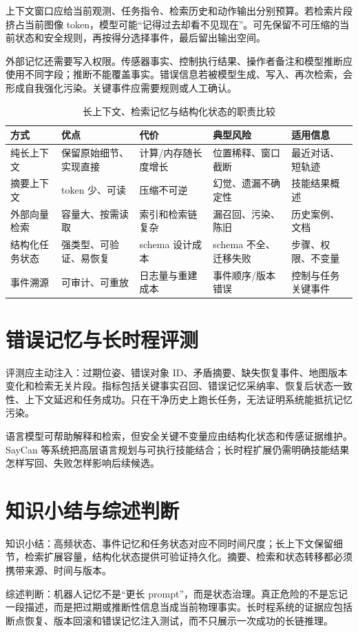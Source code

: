 上下文窗口应给当前观测、任务指令、检索历史和动作输出分别预算。若检索片段挤占当前图像 token，模型可能“记得过去却看不见现在”。可先保留不可压缩的当前状态和安全规则，再按得分选择事件，最后留出输出空间。

外部记忆还需要写入权限。传感器事实、控制执行结果、操作者备注和模型推断应使用不同字段；推断不能覆盖事实。错误信息若被模型生成、写入、再次检索，会形成自我强化污染。关键事件应需要规则或人工确认。

\begin{table}[H]
\centering
\caption{长上下文、检索记忆与结构化状态的职责比较}
\label{tab:memory-strategy-comparison}
\begin{tabularx}{\textwidth}{p{}YYYY}
\toprule
方式 & 优点 & 代价 & 典型风险 & 适用信息 \\
\midrule
纯长上下文 & 保留原始细节、实现直接 & 计算/内存随长度增长 & 位置稀释、窗口截断 & 最近对话、短轨迹 \\
摘要上下文 & token 少、可读 & 压缩不可逆 & 幻觉、遗漏不确定性 & 技能结果概述 \\
外部向量检索 & 容量大、按需读取 & 索引和检索链复杂 & 漏召回、污染、陈旧 & 历史案例、文档 \\
结构化任务状态 & 强类型、可验证、易恢复 & schema 设计成本 & schema 不全、迁移失败 & 步骤、权限、不变量 \\
事件溯源 & 可审计、可重放 & 日志量与重建成本 & 事件顺序/版本错误 & 控制与任务关键事件 \\
\bottomrule
\end{tabularx}
\end{table}

\section{错误记忆与长时程评测}

评测应主动注入：过期位姿、错误对象 ID、矛盾摘要、缺失恢复事件、地图版本变化和检索无关片段。指标包括关键事实召回、错误记忆采纳率、恢复后状态一致性、上下文延迟和任务成功。只在干净历史上跑长任务，无法证明系统能抵抗记忆污染。

语言模型可帮助解释和检索，但安全关键不变量应由结构化状态和传感证据维护。SayCan 等系统把高层语言规划与可执行技能结合\cite{ahn2022saycan}；长时程扩展仍需明确技能结果怎样写回、失败怎样影响后续候选。

\section{知识小结与综述判断}

知识小结：高频状态、事件记忆和任务状态对应不同时间尺度；长上下文保留细节，检索扩展容量，结构化状态提供可验证持久化。摘要、检索和状态转移都必须携带来源、时间与版本。

综述判断：机器人记忆不是“更长 prompt”，而是状态治理。真正危险的不是忘记一段描述，而是把过期或推断性信息当成当前物理事实。长时程系统的证据应包括断点恢复、版本回滚和错误记忆注入测试，而不只展示一次成功的长链推理。
